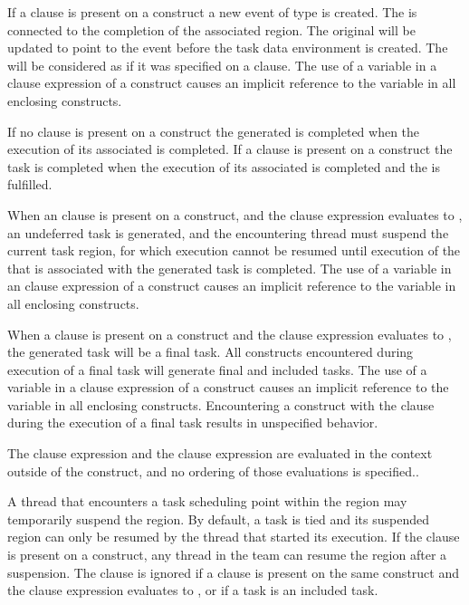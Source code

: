 If a  clause is present on a  construct a new event 
 of type  is created. The 
 is connected to the completion of the associated 
 region. The original  will be updated to point 
to the  event before the task data environment is 
created. The  will be considered as if it was specified on 
a  clause. The use of a variable in a  clause 
expression of a  construct causes an implicit reference to the 
variable in all enclosing constructs.

If no  clause is present on a  construct the generated 
 is completed when the execution of its associated 
 is completed. If a  clause is present on a 
 construct the task is completed when the execution of its associated 
 is completed and the  
is fulfilled.

When an  clause is present on a  construct, and the  
clause expression evaluates to , an undeferred task is generated, and 
the encountering thread must suspend the current task region, for which execution 
cannot be resumed until execution of the  that is associated
with the generated task is completed. The use of a variable in 
an  clause expression of a  construct causes an implicit 
reference to the variable in all enclosing constructs.

When a  clause is present on a  construct and the 
 clause expression evaluates to , the generated task 
will be a final task. All  constructs encountered during execution 
of a final task will generate final and included tasks. The use of a variable 
in a  clause expression of a  construct causes an
implicit reference to the variable in all enclosing constructs. Encountering 
a  construct with the  clause during the execution 
of a final task results in unspecified behavior.

The  clause expression and the  clause expression are 
evaluated in the context outside of the  construct, and no ordering 
of those evaluations is specified..

A thread that encounters a task scheduling point within the  region 
may temporarily suspend the  region. By default, a task is tied and 
its suspended  region can only be resumed by the thread that started 
its execution. If the  clause is present on a  construct, 
any thread in the team can resume the  region after a suspension. The 
 clause is ignored if a  clause is present on the same 
 construct and the  clause expression evaluates to 
, or if a task is an included task.

